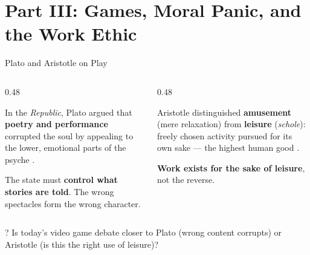 \documentclass[aspectratio=169,11pt]{beamer}
\begin{document}
\section{Part III: Games, Moral Panic, and the Work Ethic}

\begin{frame}[t]{Plato and Aristotle on Play}
\begin{columns}[T]
\begin{column}{0.48\textwidth}
\begin{objectionbox}
\footnotesize
In the \emph{Republic}, Plato argued that \textbf{poetry and performance} corrupted the soul by appealing to the lower, emotional parts of the psyche \parencite{plato_republic}.

\vspace{0.1cm}
The state must \textbf{control what stories are told}. The wrong spectacles form the wrong character.
\end{objectionbox}
\end{column}
\begin{column}{0.48\textwidth}
\begin{probox}
\footnotesize
Aristotle distinguished \textbf{amusement} (mere relaxation) from \textbf{leisure} (\emph{schole}): freely chosen activity pursued for its own sake --- the highest human good \parencite{aristotle_nicomachean}.

\vspace{0.1cm}
\textbf{Work exists for the sake of leisure}, not the reverse.
\end{probox}
\end{column}
\end{columns}

\vspace{0.15cm}
\begin{alertblock}{?}
\footnotesize
Is today's video game debate closer to Plato (wrong content corrupts) or Aristotle (is this the right use of leisure)?
\end{alertblock}
\end{frame}
\end{document}
